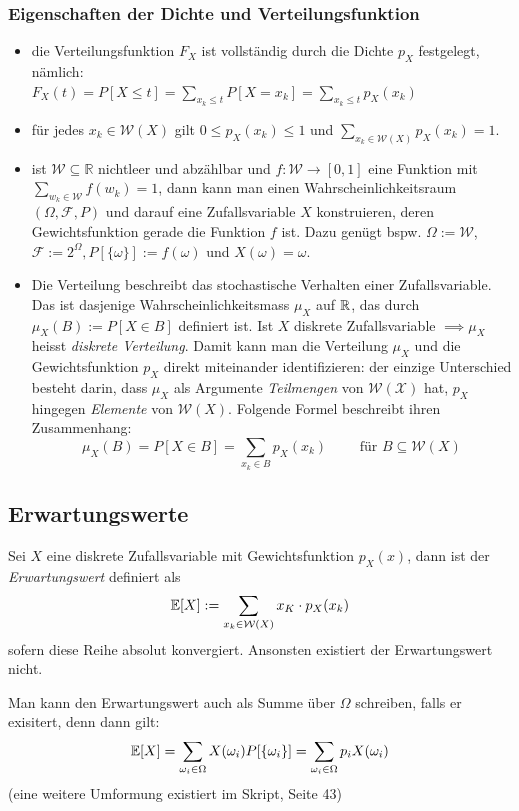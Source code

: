 \subsubsection*{Eigenschaften der Dichte und Verteilungsfunktion}
\begin{itemize}
\item die Verteilungsfunktion $F_X$ ist vollständig durch die Dichte $p_X$ festgelegt, nämlich:\\ $F_X(t) = P[X \leq t] = \sum_{x_k \leq t} P[X = x_k] = \sum_{x_k \leq t}p_X(x_k)$
\item für jedes $x_k \in \mathcal{W}(X)$ gilt $0 \leq p_X(x_k) \leq 1$ und $\sum_{x_k \in \mathcal{W}(X)} p_X(x_k) = 1$.
\item ist $\mathcal{W}\subseteq \mathbb{R}$ nichtleer und abzählbar und $f:\mathcal{W}\to [0, 1]$ eine Funktion mit $\sum_{w_k \in \mathcal{W}} f(w_k) = 1$, dann kann man einen Wahrscheinlichkeitsraum $(\Omega, \mathcal{F}, P)$ und darauf eine Zufallsvariable $X$ konstruieren, deren Gewichtsfunktion gerade die Funktion $f$ ist. Dazu genügt bspw. $\Omega := \mathcal{W}$, $\mathcal{F} := 2^\Omega, P[\{\omega\}] := f(\omega)$ und $X(\omega) = \omega$.
\item Die Verteilung beschreibt das stochastische Verhalten einer Zufallsvariable. Das ist dasjenige Wahrscheinlichkeitsmass $\mu_X$ auf $\mathbb{R}$, das durch $\mu_X(B) := P[X \in B]$ definiert ist. Ist $X$ diskrete Zufallsvariable $\implies \mu_X$ heisst \textit{diskrete Verteilung}. Damit kann man die Verteilung $\mu_X$ und die Gewichtsfunktion $p_X$ direkt miteinander identifizieren: der einzige Unterschied besteht darin, dass $\mu_X$ als Argumente \textit{Teilmengen} von $\mathcal{W(X)}$ hat, $p_X$ hingegen \textit{Elemente} von $\mathcal{W}(X)$. Folgende Formel beschreibt ihren Zusammenhang:
$$ \mu_X(B) = P[X \in B] = \sum_{x_k \in B} p_X(x_k) \quad \quad \mbox{ für } B\subseteq \mathcal{W}(X)$$
\end{itemize}


\subsection{Erwartungswerte}
\begin{definition}
Sei $X$ eine diskrete Zufallsvariable mit Gewichtsfunktion $p_X(x)$, dann ist der \textit{Erwartungswert} definiert als
$$ \mathbb{E}[X] := \sum_{x_k \in \mathcal{W}(X)} x_K \cdot p_X(x_k)$$
sofern diese Reihe absolut konvergiert. Ansonsten existiert der Erwartungswert nicht.
\end{definition}
Man kann den Erwartungswert auch als Summe über $\Omega$ schreiben, falls er exisitert, denn dann gilt:
$$ \mathbb{E}[X] = \sum_{\omega_i \in \Omega} X(\omega_i) P[\{\omega_i\}] = \sum_{\omega_i \in \Omega} p_i X(\omega_i)$$
(eine weitere Umformung existiert im Skript, Seite 43)

